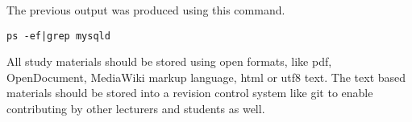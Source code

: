 The previous output was produced using this command.
\begin{verbatim}
ps -ef|grep mysqld
\end{verbatim}
\label{code_sample}
%

All study materials should be stored using open formats, like pdf, OpenDocument, MediaWiki markup language, html or utf8 text. The text based materials should be stored into a revision control system like \gls{git} to enable contributing by other lecturers and students as well.

%
%
%
%
%
%
%
%
%
%
%
%
%
%


